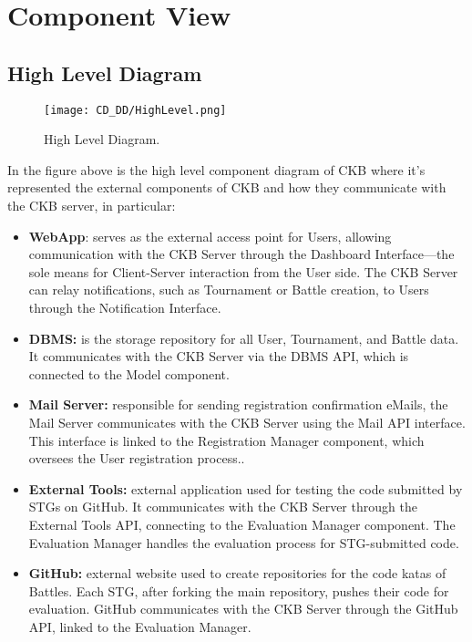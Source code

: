 \section{Component View}
\label{sec:component_view}%

\subsection{High Level Diagram}
\label{subsec:high_level_diagram}%

\begin{figure}[H]
    \begin{center}
        \texttt{[image: CD\_DD/HighLevel.png]}
        \caption{High Level Diagram.}
        \label{fig:high_level_diagram}%
    \end{center}
\end{figure}

\noindent In the figure above is the high level component diagram of CKB where it’s represented the external components of CKB and how they communicate with the CKB server, in particular:
\begin{itemize}
    \item \textbf{WebApp}: serves as the external access point for Users, allowing communication with the CKB Server through the Dashboard Interface—the sole means for Client-Server interaction from the User side. The CKB Server can relay notifications, such as Tournament or Battle creation, to Users through the Notification Interface.
    \item \textbf{DBMS:} is the storage repository for all User, Tournament, and Battle data. It communicates with the CKB Server via the DBMS API, which is connected to the Model component.
    \item \textbf{Mail Server:} responsible for sending registration confirmation eMails, the Mail Server communicates with the CKB Server using the Mail API interface. This interface is linked to the Registration Manager component, which oversees the User registration process..
    \item \textbf{External Tools:} external application used for testing the code submitted by STGs on GitHub. It communicates with the CKB Server through the External Tools API, connecting to the Evaluation Manager component. The Evaluation Manager handles the evaluation process for STG-submitted code.
    \item \textbf{GitHub:}  external website used to create repositories for the code katas of Battles. Each STG, after forking the main repository, pushes their code for evaluation. GitHub communicates with the CKB Server through the GitHub API, linked to the Evaluation Manager.
\end{itemize}

